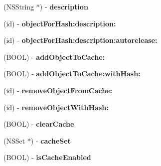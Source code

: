 \begin{DoxyCompactItemize}
\item 
\hypertarget{interface_r_k_cache_aa505f34d77ea1400b44c67fc17118ce1}{(N\-S\-String $\ast$) -\/ {\bfseries description}}\label{interface_r_k_cache_aa505f34d77ea1400b44c67fc17118ce1}

\item 
\hypertarget{interface_r_k_cache_a62d1c6218dd542a4a3f01bbf4c30d4f7}{(id) -\/ {\bfseries object\-For\-Hash\-:description\-:}}\label{interface_r_k_cache_a62d1c6218dd542a4a3f01bbf4c30d4f7}

\item 
\hypertarget{interface_r_k_cache_a78c4419a25cce30b95985cd0a1ada575}{(id) -\/ {\bfseries object\-For\-Hash\-:description\-:autorelease\-:}}\label{interface_r_k_cache_a78c4419a25cce30b95985cd0a1ada575}

\item 
\hypertarget{interface_r_k_cache_a48d6429147670a2fa30f13ac84448a81}{(B\-O\-O\-L) -\/ {\bfseries add\-Object\-To\-Cache\-:}}\label{interface_r_k_cache_a48d6429147670a2fa30f13ac84448a81}

\item 
\hypertarget{interface_r_k_cache_a7ef84b23e8b4a1dbf23ec32fef5215d4}{(B\-O\-O\-L) -\/ {\bfseries add\-Object\-To\-Cache\-:with\-Hash\-:}}\label{interface_r_k_cache_a7ef84b23e8b4a1dbf23ec32fef5215d4}

\item 
\hypertarget{interface_r_k_cache_ab0c29316fd50266177d5d158d3011a9e}{(id) -\/ {\bfseries remove\-Object\-From\-Cache\-:}}\label{interface_r_k_cache_ab0c29316fd50266177d5d158d3011a9e}

\item 
\hypertarget{interface_r_k_cache_a86e4753d32e6f6b0ce836b4eb848c26e}{(id) -\/ {\bfseries remove\-Object\-With\-Hash\-:}}\label{interface_r_k_cache_a86e4753d32e6f6b0ce836b4eb848c26e}

\item 
\hypertarget{interface_r_k_cache_a3f4c2980380e14ff2fd349c1c57aa4ae}{(B\-O\-O\-L) -\/ {\bfseries clear\-Cache}}\label{interface_r_k_cache_a3f4c2980380e14ff2fd349c1c57aa4ae}

\item 
\hypertarget{interface_r_k_cache_a2cf91ff4dec992413969d5bbd888a8e5}{(N\-S\-Set $\ast$) -\/ {\bfseries cache\-Set}}\label{interface_r_k_cache_a2cf91ff4dec992413969d5bbd888a8e5}

\item 
\hypertarget{interface_r_k_cache_a350e9b37c0bac4ed34b4f3162224dcd1}{(B\-O\-O\-L) -\/ {\bfseries is\-Cache\-Enabled}}\label{interface_r_k_cache_a350e9b37c0bac4ed34b4f3162224dcd1}


\end{DoxyCompactItemize}
